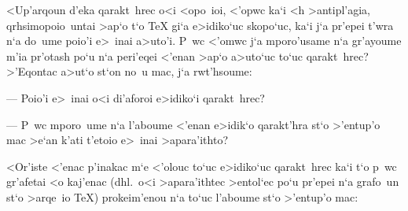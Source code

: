 <Up'arqoun d'eka qarakt~hrec o<i <opo~ioi, <'opwc ka`i <h >antipl'agia, 
qrhsi\-mopoio~u\-ntai >ap`o t`o {\rm \TeX} gi`a e>idiko`uc skopo`uc,    
ka`i j`a pr'epei t'wra n`a do~ume poio'i e>~inai a>uto'i.
P~wc <'omwc j`a mporo'u\-same n`a gr'ayoume  m'ia pr'otash po`u n`a     
peri'eqei <'enan >ap`o a>uto`uc to`uc qarakt~hrec? >'Eqontac a>ut`o     
st`on no~u mac, j`a rwt'hsoume:

\item{---} Poio'i e>~inai o<i di'aforoi e>idiko`i qarakt~hrec?

\item{---} P~wc mporo~ume n`a l'aboume <'enan e>idik`o qarakt'hra st`o
>'entup'o mac >e`an k'ati t'etoio e>~inai >apara'ithto?

<Or'iste <'enac p'inakac m`e <'olouc to`uc e>idiko`uc qarakt~hrec ka`i  
t`o p~wc gr'afetai <o kaj'enac (dhl.\ o<i >apara'ithtec >entol`ec po`u
pr'epei n`a grafo~un st`o >arqe~io {\rm \TeX}) prokeim'enou n`a to`uc
l'aboume st`o >'entup'o mac:                


